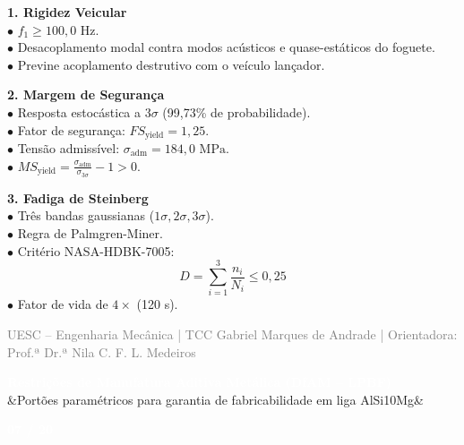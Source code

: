 \documentclass[11pt]{article}
\newcommand{\slideheader}[3]{
    \noindent
    \begin{minipage}{\textwidth}
        \colorbox{SpaceNavy}{
            \parbox{\dimexpr\textwidth-2\fboxsep\relax}{
                \vspace{0.2cm}
                \hspace{0.3cm}
                \begin{minipage}{0.85\textwidth}
                    {\Large \textbf{\textcolor{white}{#1}}}\\[0.1cm]
                    \ifx&#2&\else{\small \textbf{\textcolor{SpaceGold}{#2}}}\fi
                \end{minipage}
                \hfill
                \begin{minipage}{0.10\textwidth}
                    \raggedleft
                    {\large \textbf{\textcolor{white}{#3 / 20}}}\hspace{0.3cm}
                \end{minipage}
                \vspace{0.2cm}
            }
        }
    \end{minipage}
    \vspace{0.4cm}
}
\newcommand{\slidefooter}{
    \vfill
    \noindent
    \begin{minipage}{\textwidth}
        \centering
        \scriptsize \textcolor{gray}{UESC -- Engenharia Mecânica | TCC Gabriel Marques de Andrade | Orientadora: Prof.ª Dr.ª Nila C. F. L. Medeiros}
    \end{minipage}
}
\begin{document}
\begin{minipage}[t]{0.31\textwidth}
    \textbf{\textcolor{NavyAccent}{1. Rigidez Veicular}}\\[0.2cm]
    \small
    $\bullet$ $f_1 \ge 100{,}0\text{ Hz}$.\\
    $\bullet$ Desacoplamento modal contra modos acústicos e quase-estáticos do foguete.\\
    $\bullet$ Previne acoplamento destrutivo com o veículo lançador.
\end{minipage}
\hfill
\begin{minipage}[t]{0.31\textwidth}
    \textbf{\textcolor{NavyAccent}{2. Margem de Segurança}}\\[0.2cm]
    \small
    $\bullet$ Resposta estocástica a $3\sigma$ (99,73\% de probabilidade).\\
    $\bullet$ Fator de segurança: $FS_{\text{yield}} = 1{,}25$.\\
    $\bullet$ Tensão admissível: $\sigma_{\text{adm}} = 184{,}0\text{ MPa}$.\\
    $\bullet$ $MS_{\text{yield}} = \frac{\sigma_{\text{adm}}}{\sigma_{3\sigma}} - 1 > 0$.
\end{minipage}
\hfill
\begin{minipage}[t]{0.31\textwidth}
    \textbf{\textcolor{NavyAccent}{3. Fadiga de Steinberg}}\\[0.2cm]
    \small
    $\bullet$ Três bandas gaussianas ($1\sigma, 2\sigma, 3\sigma$).\\
    $\bullet$ Regra de Palmgren-Miner.\\
    $\bullet$ Critério NASA-HDBK-7005:
    \begin{equation*}
        D = \sum_{i=1}^3 \frac{n_i}{N_i} \le 0{,}25
    \end{equation*}
    $\bullet$ Fator de vida de $4\times$ (120 s).
\end{minipage}

\slidefooter
\clearpage

\slideheader{Restrições de Manufatura Aditiva Metálica (DfAM -- LPBF)}{Portões paramétricos para garantia de fabricabilidade em liga AlSi10Mg}{07}
\end{document}
